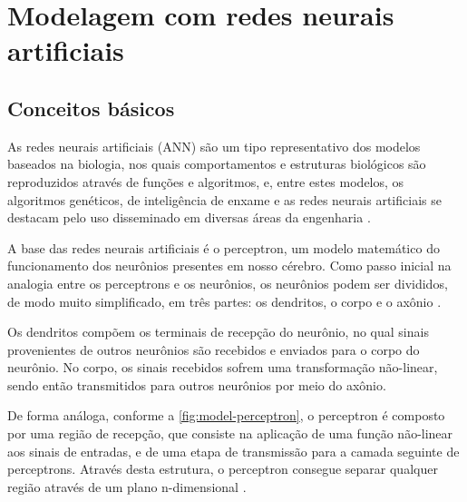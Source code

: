 \chapter{Modelagem com redes neurais artificiais} \label{cha:model}

\section{Conceitos básicos} \label{sec:model-basic}

As redes neurais artificiais (ANN) são um tipo representativo dos modelos baseados na biologia, nos quais comportamentos e estruturas biológicos são reproduzidos através de funções e algoritmos, e, entre estes modelos, os algoritmos genéticos, de inteligência de enxame e as redes neurais artificiais se destacam pelo uso disseminado em diversas áreas da engenharia \cite{Darwish2018} \cite{Fan2020}.

A base das redes neurais artificiais é o perceptron, um modelo matemático do funcionamento dos neurônios presentes em nosso cérebro. Como passo inicial na analogia entre os perceptrons e os neurônios, os neurônios podem ser divididos, de modo muito simplificado, em três partes: os dendritos, o corpo e o axônio \cite{hall_tratado_2011}.

Os dendritos compõem os terminais de recepção do neurônio, no qual sinais provenientes de outros neurônios são recebidos e enviados para o corpo do neurônio. No corpo, os sinais recebidos sofrem uma transformação não-linear, sendo então transmitidos para outros neurônios por meio do axônio.

De forma análoga, conforme a \autoref{fig:model-perceptron}, o perceptron é composto por uma região de recepção, que consiste na aplicação de uma função não-linear aos sinais de entradas, e de uma etapa de transmissão para a camada seguinte de perceptrons. Através desta estrutura, o perceptron consegue separar qualquer região através de um plano n-dimensional \cite{haykin1999neural}.

